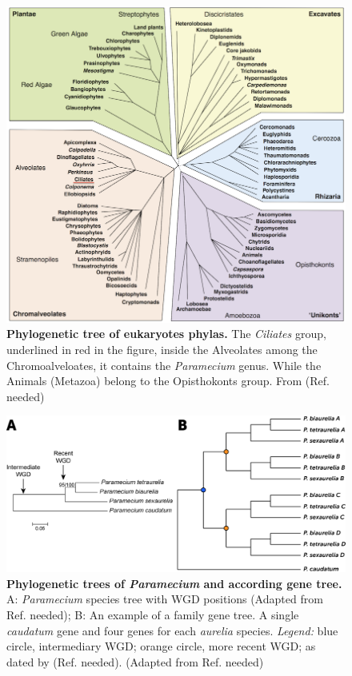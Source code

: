 \documentclass[10pt]{article}
\begin{document}
\begin{figure}[!ht]
\begin{center}
\includegraphics[scale=2.2]{Figures/TreeOfEuk.png}
\end{center}
\caption{
{\bf Phylogenetic tree of eukaryotes phylas.} The \textit{Ciliates} group, underlined in red in the figure, inside the Alveolates among the Chromoalveloates, it contains the \textit{Paramecium} genus. While the Animals (Metazoa) belong to the Opisthokonts group. From (Ref. needed)
} 
\label{fig:TreeOfEuk}
\end{figure}


\begin{figure}[!ht]
\begin{center}
\includegraphics[scale=0.7]{Figures/SpeciesGene.png}
\end{center}
\caption{
{\bf Phylogenetic trees of \textit{Paramecium} and according gene tree.} A: \textit{Paramecium} species tree with WGD positions (Adapted from Ref. needed); B: An example of a family gene tree. A single \textit{caudatum} gene and four genes for each \textit{aurelia} species. \textit{Legend:} blue circle, intermediary WGD; orange circle, more recent WGD; as dated by (Ref. needed). (Adapted from Ref. needed)
}
\label{fig:DuplicationTree}
\end{figure}
\end{document}
